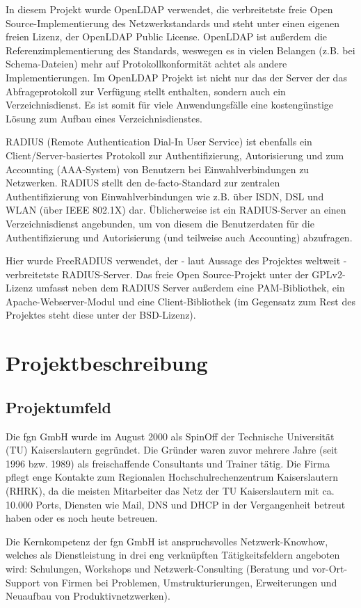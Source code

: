 \documentclass[11pt,a4paper,titlepage=firstiscover,headsepline,bibtotoc]{scrartcl} %
\begin{document}
In diesem Projekt wurde OpenLDAP verwendet, die verbreitetste freie Open Source-Implementierung des Netzwerkstandards und steht unter einen eigenen freien Lizenz, der OpenLDAP Public License. OpenLDAP ist außerdem die Referenzimplementierung des Standards, weswegen es in vielen Belangen (z.B. bei Schema-Dateien) mehr auf Protokollkonformität achtet als andere Implementierungen. Im OpenLDAP Projekt ist nicht nur das der Server der das Abfrageprotokoll zur Verfügung stellt enthalten, sondern auch ein Verzeichnisdienst. Es ist somit für viele Anwendungsfälle eine kostengünstige Lösung zum Aufbau eines Verzeichnisdienstes.

RADIUS (Remote Authentication Dial-In User Service) ist ebenfalls ein Client/Server-basiertes Protokoll zur Authentifizierung, Autorisierung und zum Accounting (AAA-System) von Benutzern bei Einwahlverbindungen zu Netzwerken. RADIUS stellt den de-facto-Standard zur zentralen Authentifizierung von Einwahlverbindungen wie z.B. über ISDN, DSL und WLAN (über IEEE 802.1X) dar. Üblicherweise ist ein RADIUS-Server an einen Verzeichnisdienst angebunden, um von diesem die Benutzerdaten für die Authentifizierung und Autorisierung (und teilweise auch Accounting) abzufragen.

Hier wurde FreeRADIUS verwendet, der - laut Aussage des Projektes weltweit - verbreitetste RADIUS-Server. Das freie Open Source-Projekt unter der GPLv2-Lizenz umfasst neben dem RADIUS Server außerdem eine PAM-Bibliothek, ein Apache-Webserver-Modul und eine Client-Bibliothek (im Gegensatz zum Rest des Projektes steht diese unter der BSD-Lizenz).

\section{Projektbeschreibung}
\subsection{Projektumfeld}
Die fgn GmbH wurde im August 2000 als SpinOff der Technische Universität (TU) Kaiserslautern gegründet. Die Gründer waren zuvor mehrere Jahre (seit 1996 bzw. 1989) als freischaffende Consultants und Trainer tätig. Die Firma pflegt enge Kontakte zum Regionalen Hochschulrechenzentrum Kaiserslautern (RHRK), da die meisten Mitarbeiter das Netz der TU Kaiserslautern mit ca. 10.000 Ports, Diensten wie Mail, DNS und DHCP in der Vergangenheit betreut haben oder es noch heute betreuen.

Die Kernkompetenz der fgn GmbH ist anspruchsvolles Netzwerk-Knowhow, welches als Dienstleistung in drei eng verknüpften Tätigkeitsfeldern angeboten wird: Schulungen, Workshops und Netzwerk-Consulting (Beratung und vor-Ort-Support von Firmen bei Problemen, Umstrukturierungen, Erweiterungen und Neuaufbau von Produktivnetzwerken).
\end{document}
